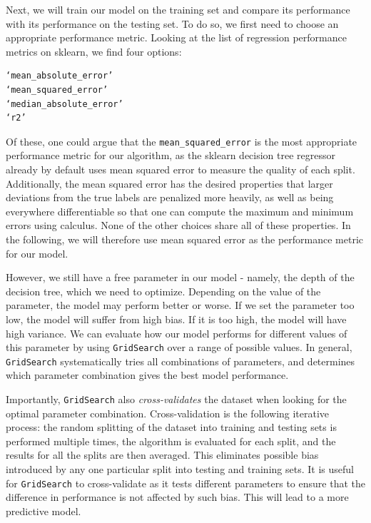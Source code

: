 \documentclass[12 pt]{article}
\numberwithin{equation}{section}
\begin{document}
Next, we will train our model on the training set and compare its performance with its performance on the testing set. To do so, we first need to choose an appropriate performance metric. Looking at the list of regression performance metrics on sklearn, we find four options:
\begin{verbatim} 	 
‘mean_absolute_error’ 
‘mean_squared_error’		 
‘median_absolute_error’		 
‘r2’
\end{verbatim}
Of these, one could argue that the \texttt{mean\_squared\_error} is the most appropriate performance metric for our algorithm, as the sklearn decision tree regressor already by default uses mean squared error to measure the quality of each split. Additionally, the mean squared error has the desired properties that larger deviations from the true labels are penalized more heavily, as well as being everywhere differentiable so that one can compute the maximum and minimum errors using calculus. None of the other choices share all of these properties. In the following, we will therefore use mean squared error as the performance metric for our model.

 However, we still have a free parameter in our model - namely, the depth of the decision tree, which we need to optimize. Depending on the value of the parameter, the model may perform better or worse. If we set the parameter too low, the model will suffer from high bias. If it is too high, the model will have high variance. We can evaluate how our model performs for different values of this parameter by using \texttt{GridSearch} over a range of possible values. In general, \texttt{GridSearch} systematically tries all combinations of parameters, and determines which parameter combination gives the best model performance. 
 
 Importantly, \texttt{GridSearch} also \emph{cross-validates} the dataset when looking for the optimal parameter combination. Cross-validation is the following iterative process: the random splitting of the dataset into training and testing sets is performed multiple times, the algorithm is evaluated for each split, and the results for all the splits are then averaged. This eliminates possible bias introduced by any one particular split into testing and training sets. It is useful for \texttt{GridSearch} to cross-validate as it tests different parameters to ensure that the difference in performance is not affected by such bias. This will lead to a more predictive model.
 
\end{document}
